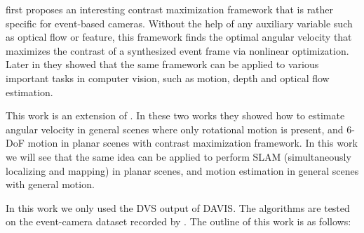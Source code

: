 \citet{gallego2017accurate} first proposes an interesting contrast
maximization framework that is rather specific for event-based
cameras. Without the help of any auxiliary variable such as optical
flow or feature, this framework finds the optimal angular velocity
that maximizes the contrast of a synthesized event frame via nonlinear
optimization. Later in \citep{gallego2018unifying} they showed that
the same framework can be applied to various important tasks in
computer vision, such as motion, depth and optical flow estimation.

This work is an extension of \citep{gallego2017accurate,
  gallego2018unifying}. In these two works they showed how to estimate
angular velocity in general scenes where only rotational motion is
present, and 6-DoF motion in planar scenes with contrast maximization
framework. In this work we will see that the same idea can be applied
to perform SLAM (simultaneously localizing and mapping) in planar
scenes, and motion estimation in general scenes with general motion.

In this work we only used the DVS output of
DAVIS\citep{brandli2014240}. The algorithms are tested on the
event-camera dataset recorded by \citet{mueggler2017event}.  The
outline of this work is as follows:
